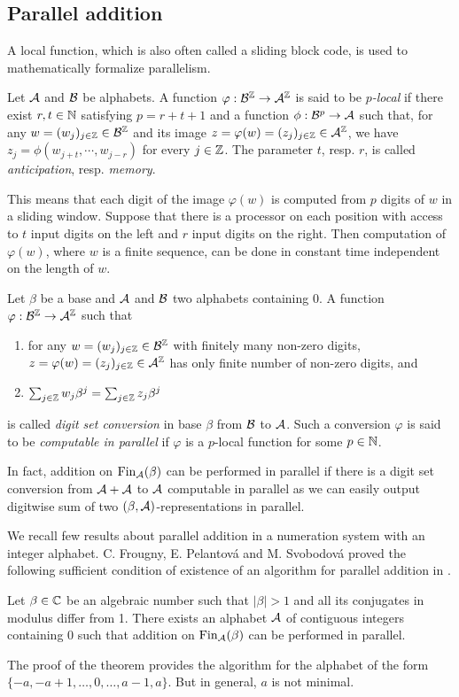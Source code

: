 \begin{upravit}
\section{Parallel addition}
A local function, which is also often called a sliding block code, is used to mathematically formalize parallelism. 
\begin{defn}
Let $\mathcal{A}$ and $\mathcal{B}$ be alphabets. A function $\varphi:\mathcal{B}^{\mathbb{Z}} \rightarrow \mathcal{A}^{\mathbb{Z}}$ is said to be \emph{$p$-local} if there exist $r,t\in\mathbb{N}$ satisfying $p=r+t+1$ and a function $\phi: \mathcal{B}^p \rightarrow \mathcal{A}$ such that, for any $w=(w_j)_{j\in\mathbb{Z}}\in\mathcal{B}^{\mathbb{Z}}$ and its image $z=\varphi(w)=(z_j)_{j\in\mathbb{Z}}\in\mathcal{A}^{\mathbb{Z}}$, we have $z_j=\phi(w_{j+t},\cdots,w_{j-r})$ for every $j\in\mathbb{Z}$. The parameter $t$, resp. $r$, is called \emph{anticipation}, resp. \emph{memory}.
\end{defn}
This means that each digit of the image $\varphi(w)$ is computed from $p$ digits of $w$ in a sliding window. Suppose that there is a processor on  each position with access to $t$ input digits on the left and $r$ input digits on the right. Then computation of $\varphi(w)$, where $w$ is a finite sequence, can be done in constant time independent on the length of $w$.   
  
\begin{defn}
\label{def:digitSetConversion}
Let $\beta$ be a base and $\mathcal{A}$ and $\mathcal{B}$ two alphabets containing 0. A function $\varphi:\mathcal{B}^{\mathbb{Z}}\rightarrow \mathcal{A}^{\mathbb{Z}}$ such that
  \begin{enumerate}
      \item for any $w=(w_j)_{j\in\mathbb{Z}}\in\mathcal{B}^{\mathbb{Z}}$ with finitely many non-zero digits, $z=\varphi(w)=(z_j)_{j\in\mathbb{Z}}\in\mathcal{A}^{\mathbb{Z}}$ has only finite number of non-zero digits, and
      \item $\sum_{j\in\mathbb{Z}} w_j \beta^j= \sum_{j\in\mathbb{Z}} z_j \beta^j$
  \end{enumerate}
  is called \emph{digit set conversion} in base $\beta$ from $\mathcal{B}$ to $\mathcal{A}$. Such a conversion $\varphi$ is said to be \emph{computable in parallel} if $\varphi$ is a $p$-local function for some $p\in\mathbb{N}$. 
\end{defn}
In fact, addition on $\text{Fin}_{\mathcal{A}}(\beta)$ can be performed in parallel if there is a digit set conversion from $\mathcal{A}+\mathcal{A}$ to $\mathcal{A}$ computable in  parallel as we can easily output digitwise sum of two $(\beta,\mathcal{A})$-representations in parallel.   


We recall few results about parallel addition in a numeration system with an integer alphabet. C. Frougny, E. Pelantov\'a and M. Svobodov\'a proved  the following sufficient condition of existence of an algorithm for parallel addition in \cite{parAddNS}.
  \begin{thm}
  \label{thm:suffConjugates}
  Let $\beta\in\mathbb{C}$ be an algebraic number such that $|\beta|>1$ and all its conjugates in modulus differ from 1. There exists an alphabet $\mathcal{A}$ of contiguous integers containing 0 such that addition on $\text{Fin}_{\mathcal{A}}(\beta)$ can be performed in parallel.
  \end{thm}
  The proof of the theorem provides the algorithm for the alphabet of the form $\{-a,-a+1, \dots,0,\dots,a-1,a\}$. But in general, $a$ is not minimal.
    

\end{upravit}
